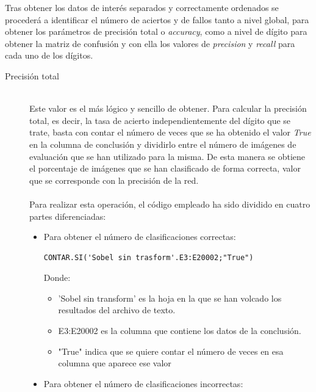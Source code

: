 Tras obtener los datos de interés separados y correctamente ordenados se procederá a identificar el número de aciertos y de fallos tanto a nivel global, para obtener los parámetros de precisión total o \textit{accuracy}, como a nivel de dígito para obtener la matriz de confusión y con ella los valores de \textit{precision} y \textit{recall} para cada uno de los dígitos.\\

\begin{description}
	\item[Precisión total] \hfill 
	\vspace{10pt}
	\\
	Este valor es el más lógico y sencillo de obtener. Para calcular la precisión total, es decir, la tasa de acierto independientemente del dígito que se trate, basta con contar el número de veces que se ha obtenido el valor \textit{True} en la columna de conclusión y dividirlo entre el número de imágenes de evaluación que se han utilizado para la misma. De esta manera se obtiene el porcentaje de imágenes que se han clasificado de forma correcta, valor que se corresponde con la precisión de la red.\\
	\vspace{-10pt}
	\\
	Para realizar esta operación, el código empleado ha sido dividido en cuatro partes diferenciadas:\\
	\vspace{-20pt}
	\begin{itemize}
		\item{Para obtener el número de clasificaciones correctas:
		\vspace{10pt}
		\begin{lstlisting}[frame=single]
			CONTAR.SI('Sobel sin trasform'.E3:E20002;"True")
		\end{lstlisting}
		Donde:
		\begin{itemize}
			\item 'Sobel sin transform' es la hoja en la que se han volcado los resultados del archivo de texto.
			\item E3:E20002 es la columna que contiene los datos de la conclusión.
			\item "True" indica que se quiere contar el número de veces en esa columna que aparece ese valor
		\end{itemize}
	}
	\item{Para obtener el número de clasificaciones incorrectas:
		\vspace{10pt}
}
\end{itemize}
\end{description}
